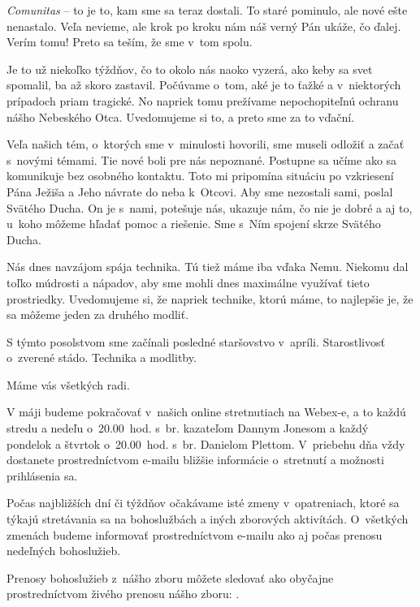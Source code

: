 {\it Comunitas} -- to je to, kam sme sa teraz dostali. To staré pominulo, ale nové ešte nenastalo. Veľa nevieme, ale krok po kroku nám náš verný Pán ukáže, čo ďalej. Verím tomu! Preto sa teším, že sme v~tom spolu.



Je to už niekoľko týždňov, čo to okolo nás naoko vyzerá, ako keby sa svet spomalil, ba až skoro zastavil. Počúvame o~tom, aké je to ťažké a v~niektorých prípadoch priam tragické. No napriek tomu prežívame nepochopiteľnú ochranu nášho Nebeského Otca. Uvedomujeme si to, a preto sme za to vďační.

Veľa našich tém, o~ktorých sme v~minulosti hovorili, sme museli odložiť a začať s~novými témami. Tie nové boli pre nás nepoznané. Postupne sa učíme ako sa komunikuje bez osobného kontaktu. Toto mi pripomína situáciu po vzkriesení Pána Ježiša a Jeho návrate do neba k~Otcovi. Aby sme nezostali sami, poslal Svätého Ducha. On je s~nami, potešuje nás, ukazuje nám, čo nie je dobré a aj to, u~koho môžeme hľadať pomoc a riešenie. Sme s~Ním spojení skrze Svätého Ducha.

Nás dnes navzájom spája technika. Tú tiež máme iba vďaka Nemu. Niekomu dal toľko múdrosti a nápadov, aby sme mohli dnes maximálne využívať tieto prostriedky. Uvedomujeme si, že napriek technike, ktorú máme, to najlepšie je, že sa môžeme jeden za druhého modliť.

S týmto posolstvom sme začínali posledné staršovstvo v~apríli. Starostlivosť o~zverené stádo. Technika a modlitby.

Máme vás všetkých radi.



V máji budeme pokračovať v~našich online stretnutiach na Webex-e, a to každú stredu a nedeľu o~20.00~hod. s~br. kazateľom Dannym Jonesom a každý pondelok a štvrtok o~20.00~hod. s~br. Danielom Plettom. V~priebehu dňa vždy dostanete prostredníctvom e-mailu bližšie informácie o~stretnutí a možnosti prihlásenia sa.

Počas najbližších dní či týždňov očakávame isté zmeny v~opatreniach, ktoré sa týkajú stretávania sa na bohoslužbách a iných zborových aktivítách. O~všetkých zmenách budeme informovať prostredníctvom e-mailu ako aj počas prenosu nedeľných bohoslužieb.

Prenosy bohoslužieb z~nášho zboru môžete sledovať ako obyčajne prostredníctvom živého prenosu nášho zboru: .


